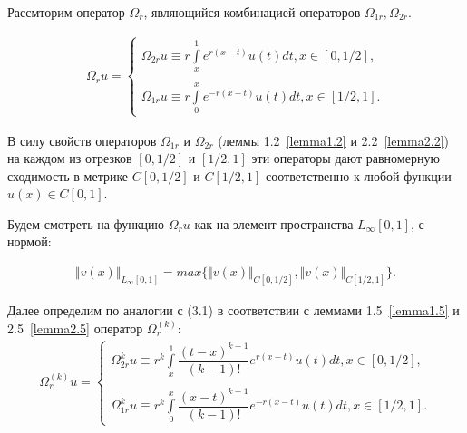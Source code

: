 Рассмторим оператор $ \Omega_r $, являющийся комбинацией операторов $ \Omega_{1r}, \Omega_{2r} $.

\begin{equation}
\begin{array}{c}

\Omega_r u = \left\{
\begin{array}{l}
\Omega_{2r}u \equiv r\int\limits_x^1 e^{r(x-t)}u(t)dt, x \in [0,1/2], \\\\
\Omega_{1r}u \equiv r\int\limits_0^x e^{-r(x-t)}u(t)dt, x \in [1/2,1].
\end{array}
\right.

\end{array}
\end{equation}

В силу свойств операторов $ \Omega_{1r} $ и $ \Omega_{2r} $ (леммы 1.2~\eqref{lemma1.2} и 2.2~\eqref{lemma2.2}) на каждом из отрезков $ [0,1/2] $ и $ [1/2,1] $ эти операторы дают равномерную сходимость в метрике $ C[0,1/2] $ и $ C[1/2,1] $ соответственно к любой функции $ u(x) \in C[0,1] $.

Будем смотреть на функцию $ \Omega_r u $ как на элемент пространства $ L_\infty[0,1] $, с нормой:

\begin{equation}
\begin{array}{c}

\Vert v(x)\Vert_{L_\infty[0,1]} = max\lbrace \Vert v(x) \Vert_{C[0,1/2]}, \Vert v(x) \Vert_{C[1/2,1]} \rbrace.

\end{array}
\end{equation}

Далее определим по аналогии с (3.1) в соответствии с леммами 1.5~\eqref{lemma1.5} и 2.5~\eqref{lemma2.5} оператор $ \Omega_r^{(k)} $:
\begin{equation}
\begin{array}{c}

\Omega_r^{(k)} u = \left\{
\begin{array}{l}
\Omega_{2r}^ku \equiv r^k\int\limits_x^1 \dfrac{(t-x)^{k-1}}{(k-1)!} e^{r(x-t)}u(t)dt, x \in [0,1/2], \\\\
\Omega_{1r}^ku \equiv r^k\int\limits_0^x \dfrac{(x-t)^{k-1}}{(k-1)!} e^{-r(x-t)}u(t)dt, x \in [1/2,1].
\end{array}
\right.

\end{array}
\end{equation}

